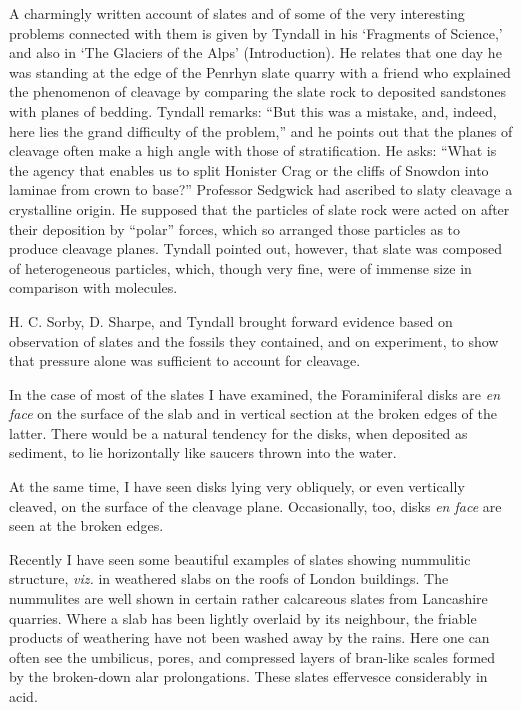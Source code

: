 \documentclass[a4paper, 12pt, oneside]{article}
\begin{document}
A charmingly written account of slates and of some of the very interesting problems connected with them is given by Tyndall in his `Fragments of Science,' and also in `The Glaciers of the Alps' (Introduction). He relates that one day he was standing at the edge of the Penrhyn slate quarry with a friend who explained the phenomenon of cleavage by comparing the slate rock to deposited sandstones with planes of bedding. Tyndall remarks: ``But this was a mistake, and, indeed, here lies the grand difficulty of the problem,'' and he points out that the planes of cleavage often make a high angle with those of stratification. He asks: ``What is the agency that enables us to split Honister Crag or the cliffs of Snowdon into laminae from crown to base?'' Professor Sedgwick had ascribed to slaty cleavage a crystalline origin. He supposed that the particles of slate rock were acted on after their deposition by ``polar'' forces, which so arranged those particles as to produce cleavage planes. Tyndall pointed out, however, that slate was composed of heterogeneous particles, which, though very fine, were of immense size in comparison with molecules.

H. C. Sorby, D. Sharpe, and Tyndall brought forward evidence based on observation of slates and the fossils they contained, and on experiment, to show that pressure alone was sufficient to account for cleavage.

In the case of most of the slates I have examined, the Foraminiferal disks are \emph{en face} on the surface of the slab and in vertical section at the broken edges of the latter. There would be a natural tendency for the disks, when deposited as sediment, to lie horizontally like saucers thrown into the water.

At the same time, I have seen disks lying very obliquely, or even vertically cleaved, on the surface of the cleavage plane. Occasionally, too, disks \emph{en face} are seen at the broken edges.

Recently I have seen some beautiful examples of slates showing nummulitic structure, \emph{viz.} in weathered slabs on the roofs of London buildings. The nummulites are well shown in certain rather calcareous slates from Lancashire quarries. Where a slab has been lightly overlaid by its neighbour, the friable products of weathering have not been washed away by the rains. Here one can often see the umbilicus, pores, and compressed layers of bran-like scales formed by the broken-down alar prolongations. These slates effervesce considerably in acid.
\end{document}
